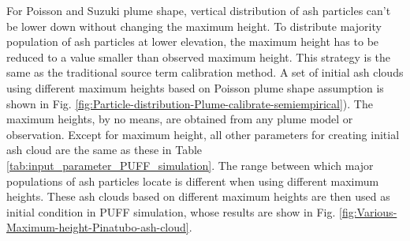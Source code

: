 \begin{figure}[!htb]
    \label{fig:Particle-distribution-Plume-SPH-vs-semiempirical}
\end{figure}

For Poisson and Suzuki plume shape, vertical distribution of ash particles can't be lower down without changing the maximum height. To distribute majority population of ash particles at lower elevation, the maximum height has to be reduced to a value smaller than observed maximum height. This strategy is the same as the traditional source term calibration method. A set of initial ash clouds using different maximum heights based on Poisson plume shape assumption is shown in Fig. \ref{fig:Particle-distribution-Plume-calibrate-semiempirical}). The maximum heights, by no means, are obtained from any plume model or observation. Except for maximum height, all other parameters for creating initial ash cloud are the same as these in Table \ref{tab:input_parameter_PUFF_simulation}. The range between which major populations of ash particles locate is different when using different maximum heights. These ash clouds based on different maximum heights are then used as initial condition in PUFF simulation, whose results are show in Fig. \ref{fig:Various-Maximum-height-Pinatubo-ash-cloud}.

